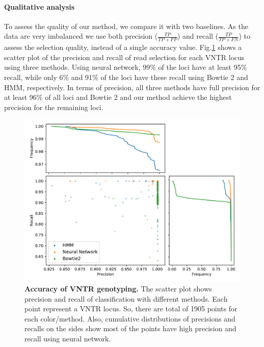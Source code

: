 \paragraph{Qualitative analysis}
To assess the quality of our method, we compare it with two baselines. As the data are very imbalanced we use both precision ($\frac{TP}{TP+FP}$) and recall ($\frac{TP}{TP+FN}$) to assess the selection quality, instead of a single accuracy value\cite{Zou2018}. Fig.\ref{fig:accuracy} shows a scatter plot of the precision and recall of read selection for each VNTR locus using three methods. Using neural network, 99\% of the loci have at least 95\% recall, while only 6\% and 91\% of the loci have these recall using Bowtie 2 and HMM, respectively. In terms of precision, all three methods have full precision for at least 96\% of all loci and Bowtie 2 and our method achieve the highest precision for the remaining loci.
\begin{figure}[ht]
\vskip -0.1in
\begin{center}
\centerline{\includegraphics[width=\columnwidth]{fig/accuracy.pdf}}
\caption{\footnotesize{\bf Accuracy of VNTR genotyping.}
 The scatter plot shows precision and recall of classification with different methods. Each point represent a VNTR locus. So, there are total of 1905 points for each color/method. Also, cumulative distributions of precisions and recalls on the sides show most of the points have high precision and recall using neural network.}
  \label{fig:accuracy}
\end{center}
\vspace{-0.3in}
\end{figure}

